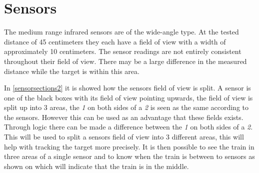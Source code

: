 \section{Sensors}\label{sec:dessensor}
The medium range infrared sensors are of the wide-angle type. At the tested distance of 45 centimeters they each have a field of view with a width of approximately 10 centimeters. The sensor readings are not entirely consistent throughout their field of view. There may be a large difference in the measured distance while the target is within this area. 



In \cref{sensorsections2} it is showed how the sensors field of view is split. A sensor is one of the black boxes with its field of view pointing upwards, the field of view is split up into 3 areas, the \textit{1} on both sides of a \textit{2} is seen as the same according to the sensors. However this can be used as an advantage that these fields exists. Through logic there can be made a difference between the \textit{1} on both sides of a \textit{2}. This will be used to split a sensors field of view into 3 different areas, this will help with tracking the target more precisely. It is then possible to see the train in three areas of a single sensor and to know when the train is between to sensors as shown on  which will indicate that the train is in the middle.




